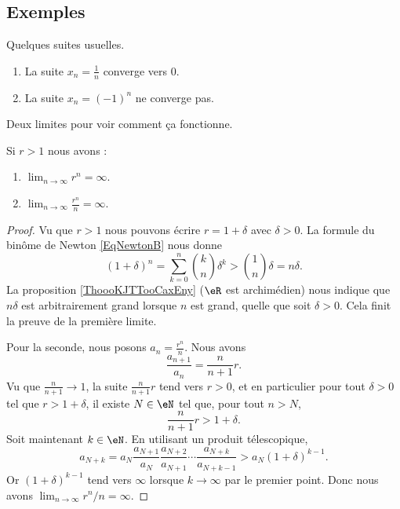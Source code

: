 \subsection{Exemples}

\begin{example}
	Quelques suites usuelles.
	\begin{enumerate}
		\item
			La suite $x_n=\frac{1}{ n }$ converge vers $0$.
		\item
			La suite $x_n=(-1)^n$ ne converge pas.
	\end{enumerate}
\end{example}

Deux limites pour voir comment ça fonctionne.
\begin{lemma}
    Si \( r>1\) nous avons :
    \begin{enumerate}
        \item
            \( \lim_{n\to \infty} r^n=\infty\).
        \item
            \( \lim_{n\to \infty} \frac{ r^n }{ n }=\infty\).
    \end{enumerate}
\end{lemma}

\begin{proof}
    Vu que \( r>1\) nous pouvons écrire \( r=1+\delta\) avec \( \delta>0\). La formule du binôme de Newton \eqref{EqNewtonB} nous donne
    \begin{equation}
        (1+\delta)^n=\sum_{k=0}^n{k\choose n}\delta^k>{1\choose n}\delta=n\delta.
    \end{equation}
    La proposition \ref{ThoooKJTTooCaxEny} (\( \eR\) est archimédien) nous indique que \( n\delta\) est arbitrairement grand lorsque \( n\) est grand, quelle que soit \( \delta>0\). Cela finit la preuve de la première limite.

    Pour la seconde, nous posons \( a_n=\frac{ r^n }{ n }\). Nous avons
    \begin{equation}
        \frac{ a_{n+1} }{ a_n }=\frac{ n }{ n+1 }r.
    \end{equation}
    Vu que \( \frac{ n }{ n+1 }\to 1\), la suite \( \frac{ n }{ n+1 }r\) tend vers \( r>0\), et en particulier pour tout \( \delta>0\) tel que \( r>1+\delta\), il existe \( N\in \eN\) tel que, pour tout \( n > N \),
    \begin{equation}
        \frac{ n }{ n+1 }r>1+\delta.
    \end{equation}
    Soit maintenant \( k\in \eN\). En utilisant un produit télescopique,
    \begin{equation}
        a_{N+k}=a_N\frac{ a_{N+1} }{ a_N }\frac{ a_{N+2} }{ a_{N+1} }\cdots\frac{ a_{N+k} }{ a_{N+k-1} }>a_N(1+\delta)^{k-1}.
    \end{equation}
    Or \( (1+\delta)^{k-1}\) tend vers \( \infty\) lorsque \( k\to \infty\) par le premier point. Donc nous avons \( \lim_{n\to \infty} r^n/n=\infty\).
\end{proof}


